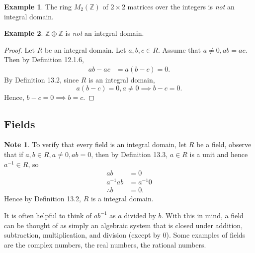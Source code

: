 \documentclass{article}
\newtheorem{theorem}{Theorem}[section]
\theoremstyle{definition}
\newtheorem{definition}{Definition}[section]
\newtheorem{example}{Example}[section]
\newtheorem{note}{Note}[section]
\begin{document}
\begin{example}
    The ring $M_2(\mathbb{Z})$ of $2\times2$ matrices over the integers is \textit{not} an integral domain.
\end{example}

\begin{example}
    $\mathbb{Z}\oplus\mathbb{Z}$ is \textit{not} an integral domain.
\end{example}

\noindent{}

\begin{proof}
    Let $R$ be an integral domain. Let $a,b,c \in R$. Assume that $a\neq0, ab=ac$. Then by Definition 12.1.6,
    \begin{align*}
        ab-ac&=a(b-c)=0.
    \end{align*}
    By Definition 13.2,
    since $R$ is an integral domain, 
    \begin{equation*}
        a(b-c)=0,a\neq0 \implies b-c=0.
    \end{equation*}
    Hence, $b-c=0\implies b=c$.
\end{proof}

\subsection{Fields}

\begin{note}
    To verify that every field is an integral domain, let $R$ be a field, observe that if $a,b\in R, a\neq0, ab=0$, then by Definition 13.3, $a\in R$ is a unit and hence $a^{-1}\in R$, so
    \begin{align*}
        ab&=0\\
        a^{-1}ab&=a^{-1}0\\
        \therefore b&=0.
    \end{align*}
    Hence by Definition 13.2, $R$ is a integral domain.
    
    It is often helpful to think of $ab^{-1}$ as $a$ divided by $b$. With this in mind, a field can be thought of as simply an algebraic system that is closed under addition, subtraction, multiplication, and division (except by 0). Some examples of fields are the complex numbers, the real numbers, the rational numbers.
\end{note}
\end{document}

